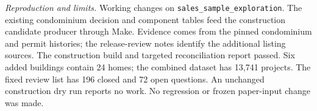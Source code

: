 \medskip
\noindent\textit{Reproduction and limits.} Working changes on \texttt{sales\_sample\_exploration}. The existing condominium decision and component tables feed the construction candidate producer through Make. Evidence comes from the pinned condominium and permit histories; the release-review notes identify the additional listing sources. The construction build and targeted reconciliation report passed. Six added buildings contain 24 homes; the combined dataset has 13,741 projects. The fixed review list has 196 closed and 72 open questions. An unchanged construction dry run reports no work. No regression or frozen paper-input change was made.
